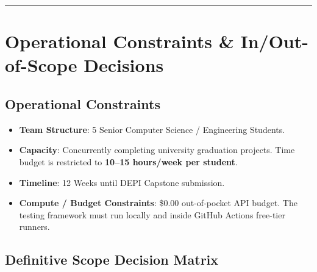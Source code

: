 \documentclass[11pt,a4paper]{article}
\begin{document}
\vspace{0.8em}
\hrule
\vspace{0.8em}

\section{Operational Constraints \& In/Out-of-Scope Decisions}

\subsection{Operational Constraints}
\begin{itemize}[leftmargin=1.5em,noitemsep]
    \item \textbf{Team Structure}: 5 Senior Computer Science / Engineering Students.
    \item \textbf{Capacity}: Concurrently completing university graduation projects. Time budget is restricted to \textbf{10--15 hours/week per student}.
    \item \textbf{Timeline}: 12 Weeks until DEPI Capstone submission.
    \item \textbf{Compute / Budget Constraints}: \$0.00 out-of-pocket API budget. The testing framework must run locally and inside GitHub Actions free-tier runners.
\end{itemize}

\subsection{Definitive Scope Decision Matrix}
\end{document}
